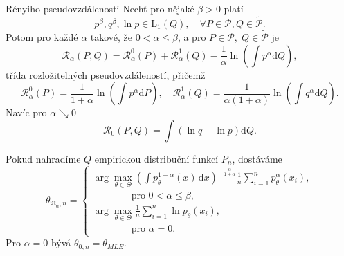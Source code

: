 \documentclass[11pt,a4paper]{beamer}
\newcommand{\intpa}{\int p_\theta^{1+\alpha}(x) \, \mathrm{d}x }
\newcommand{\fn}{\frac{1}{n} \sum_{i=1}^n p_{\theta}^{\alpha}\left( x_i \right)}
\newcommand{\fln}{\frac{1}{n} \sum_{i=1}^n \ln p_{\theta}\left( x_i \right)}
\newcommand{\amtiT}{\arg \max_{\theta \in \Theta}}
\begin{document}
\begin{frame}{Rényiho pseudovzdálenosti}
	Nechť pro nějaké $\beta>0$ platí 
	\begin{equation*}
			p^\beta, q^\beta,\ln{p} \in \mathrm{L}_1(Q), \quad \forall P \in \mathcal{P}, Q \in \mathcal{\tilde{P}}.
	\end{equation*}
		Potom pro každé $\alpha$ takové, že $0 < \alpha \leq \beta$, a pro $P \in \mathcal{P}, \; Q \in \mathcal{\tilde{P}} $ je 
	\begin{equation*}
		\mathcal{R}_\alpha (P,Q) = \mathcal{R}_\alpha^0 (P) + \mathcal{R}_\alpha^1 (Q) - \dfrac{1}{\alpha} \ln{\left( \int{p^\alpha \mathrm{d}Q } \right)},
	\end{equation*}	
	třída rozložitelných pseudovzdáleností, přičemž 
	\begin{equation*}
		\mathcal{R}_\alpha^0 (P) = \dfrac{1}{1+\alpha}\ln{\left( \int{p^\alpha \mathrm{d}P } \right)}, \quad \mathcal{R}_\alpha^1 (Q) = \dfrac{1}{\alpha (1+\alpha)}\ln{\left( \int{q^\alpha \mathrm{d}Q } \right)}.
	\end{equation*}
	Navíc pro $\alpha \searrow 0$
	\begin{equation*}
		\mathcal{R}_0 (P,Q) = \int{\left( \ln{q} - \ln{p} \right)\mathrm{d}Q}.
	\end{equation*}
\end{frame}


\begin{frame}
Pokud nahradíme $Q$ empirickou distribuční funkcí $P_n$, dostáváme 
\begin{equation*}
	\theta_{\mathfrak{R}_\alpha,n} = 
	\begin{cases}
		\displaystyle{ \amtiT \left( \intpa \right)^{-\frac{\alpha}{1+\alpha}} \fn }, \\
		\qquad \qquad \text{pro } 0 < \alpha \leq \beta, \\
		\displaystyle{ \amtiT  \fln },\\
		\qquad \qquad \text{pro } \alpha = 0.
	\end{cases}	
\end{equation*}
	Pro $\alpha = 0 $ bývá $\theta_{0,n} = \theta_{MLE}.$
\end{frame}
\end{document}
